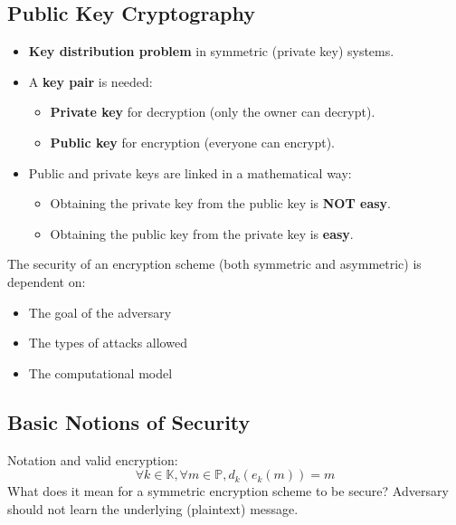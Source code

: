 \subsection{Public Key Cryptography}
\begin{itemize}
    \item \textbf{Key distribution problem} in symmetric (private key) systems.
    \item A \textbf{key pair} is needed:
    \begin{itemize}
        \item \textbf{Private key} for decryption (only the owner can decrypt).
        \item \textbf{Public key} for encryption (everyone can encrypt).
    \end{itemize}
    \item Public and private keys are linked in a mathematical way:
    \begin{itemize}
        \item Obtaining the private key from the public key is \textbf{NOT easy}.
        \item Obtaining the public key from the private key is \textbf{easy}.
    \end{itemize}
\end{itemize}

The security of an encryption scheme (both symmetric and asymmetric) is dependent on:
\begin{itemize}
    \item The goal of the adversary
    \item The types of attacks allowed
    \item The computational model
\end{itemize}

\subsection{Basic Notions of Security}
Notation and valid encryption: 
\[ \forall k \in \mathbb{K}, \forall m \in \mathbb{P}, d_k(e_k(m)) = m \]
What does it mean for a symmetric encryption scheme to be secure? Adversary should not learn the underlying (plaintext) message.

